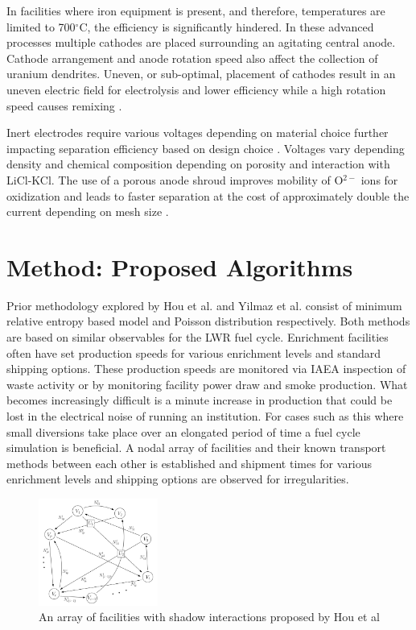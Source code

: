 \documentclass{anstrans}
\begin{document}
In facilities where iron equipment is present, and therefore, temperatures are limited to 700$^{\circ}$C, the efficiency is significantly hindered. In these advanced processes multiple cathodes are placed surrounding an agitating central anode. Cathode arrangement and anode rotation speed also affect the collection of uranium dendrites. Uneven, or sub-optimal, placement of cathodes result in an uneven electric field for electrolysis and lower efficiency while a high rotation speed causes remixing \cite{lee_advanced_nodate}.

Inert electrodes require various voltages depending on material choice further impacting separation efficiency based on design choice \cite{koyama_development_2012}. Voltages vary depending density and chemical composition depending on porosity and interaction with LiCl-KCl. The use of a porous anode shroud improves mobility of O$^{2-}$ ions for oxidization and leads to faster separation at the cost of approximately double the current depending on mesh size \cite{choi_electrochemical_2015}. 
\section{Method: Proposed Algorithms}
Prior methodology explored by Hou et al. and Yilmaz et al. \cite{Hou_2016,Yilmaz_2016} consist of minimum relative entropy based model and Poisson distribution respectively. Both methods are based on similar observables for the LWR fuel cycle. Enrichment facilities often have set production speeds for various enrichment levels and standard shipping options. These production speeds are monitored via IAEA inspection of waste activity or by monitoring facility power draw and smoke production. What becomes increasingly difficult is a minute increase in production that could be lost in the electrical noise of running an institution. For cases such as this where small diversions take place over an elongated period of time a fuel cycle simulation is beneficial. A nodal array of facilities and their known transport methods between each other is established and shipment times for various enrichment levels and shipping options are observed for irregularities. 

\begin{figure}[ht] %
	\centering
	\includegraphics[width=0.35\textwidth]{Hou_Network}
	\caption{An array of facilities with shadow interactions proposed by Hou et al\cite{Hou_2016}}
	\label{fig:maximumlikelihood}
\end{figure}
\end{document}

